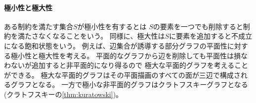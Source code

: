 \paragraph{極小性と極大性}
ある制約を満たす集合$S$が極小性を有するとは
$S$の要素を一つでも削除すると制約を満たさなくなることをいう。
同様に、極大性は$S$に要素を追加すると不成立になる飽和状態をいう。
例えば、辺集合が誘導する部分グラフの平面性に対する極小性と極大性を考える。
平面的なグラフから辺を削除しても平面性は損なわないが追加すると非平面的になり得るので
極大な平面的グラフを考えることができる。
極大な平面的グラフはその平面描画のすべての面が三辺で構成されるグラフとなる。
一方で極小な非平面的グラフはクラトフスキーグラフとなる
(クラトフスキーの\cref{thm:kuratowski})。

